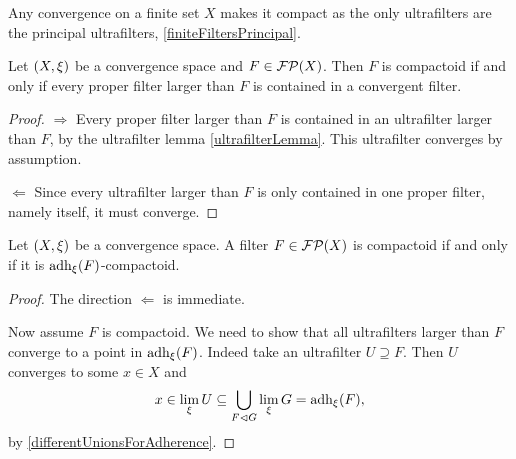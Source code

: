 \begin{example}
Any convergence on a finite set $X$ makes it compact as the only ultrafilters are the principal ultrafilters, \ref{finiteFiltersPrincipal}.
\end{example}

\begin{lemma}
Let $\sSet{X,\xi}$ be a convergence space and $F\in\operatorname{\mathcal{FP}}(X)$. Then $F$ is compactoid \textup{if and only if} every proper filter larger than $F$ is contained in a convergent filter.
\end{lemma}
\begin{proof}
$\boxed{\Rightarrow}$ Every proper filter larger than $F$ is contained in an ultrafilter larger than $F$, by the ultrafilter lemma \ref{ultrafilterLemma}. This ultrafilter converges by assumption.

$\boxed{\Leftarrow}$ Since every ultrafilter larger than $F$ is only contained in one proper filter, namely itself, it must converge.
\end{proof}

\begin{lemma} \label{allCompactoidLimitsInAdherence}
Let $\sSet{X,\xi}$ be a convergence space. A filter $F\in\operatorname{\mathcal{FP}}(X)$ is compactoid \textup{if and only if} it is $\operatorname{adh}_\xi(F)$-compactoid.
\end{lemma}
\begin{proof}
The direction $\Leftarrow$ is immediate.

Now assume $F$ is compactoid. We need to show that all ultrafilters larger than $F$ converge to a point in $\operatorname{adh}_\xi(F)$. Indeed take an ultrafilter $U\supseteq F$. Then $U$ converges to some $x\in X$ and
\[ x\in \lim_\xi U \subseteq \bigcup_{F\lhd G}\lim_\xi G = \operatorname{adh}_\xi(F), \]
by \ref{differentUnionsForAdherence}.
\end{proof}

